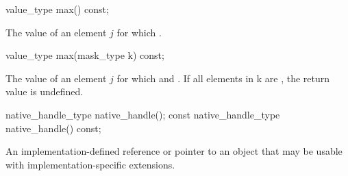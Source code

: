 \begin{itemdecl}
value_type max() const;
\end{itemdecl}
\begin{itemdescr}
  \pnum\returns The value of an element $j$ for which  \foralli.
\end{itemdescr}

\begin{itemdecl}
value_type max(mask_type k) const;
\end{itemdecl}
\begin{itemdescr}
  \pnum\returns The value of an element $j$ for which  and  \foralli.
  \pnum\remarks If all elements in \code k are \false, the return value is undefined.%
\end{itemdescr}

\begin{itemdecl}
native_handle_type native_handle();
const native_handle_type native_handle() const;
\end{itemdecl}
\begin{itemdescr}
  \pnum\returns An implementation-defined reference or pointer to an object that may be usable with implementation-specific extensions.
\end{itemdescr}


